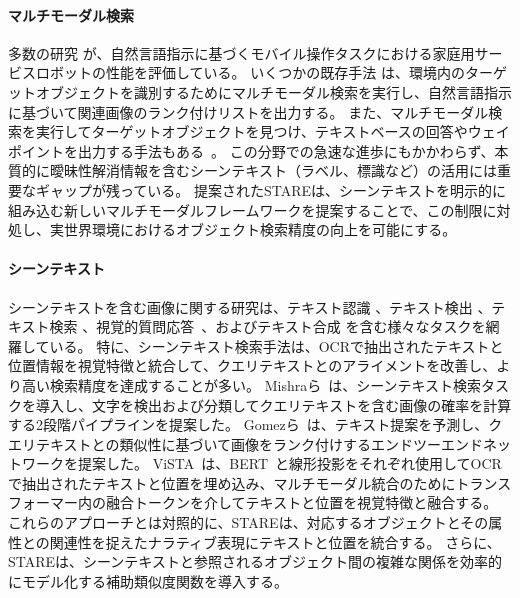 \paragraph{マルチモーダル検索}
多数の研究 \cite{Yenamandra2023HomeRobotOM, robocup}が、自然言語指示に基づくモバイル操作タスクにおける家庭用サービスロボットの性能を評価している。
いくつかの既存手法 \cite{nlmap, Sigurdsson2023RRExBoTRR, dm2rm, relaxformer}は、環境内のターゲットオブジェクトを識別するためにマルチモーダル検索を実行し、自然言語指示に基づいて関連画像のランク付けリストを出力する。
また、マルチモーダル検索を実行してターゲットオブジェクトを見つけ、テキストベースの回答やウェイポイントを出力する手法もある~\cite{xie2025embodiedrag}。
この分野での急速な進歩にもかかわらず、本質的に曖昧性解消情報を含むシーンテキスト（ラベル、標識など）の活用には重要なギャップが残っている。
提案されたSTAREは、シーンテキストを明示的に組み込む新しいマルチモーダルフレームワークを提案することで、この制限に対処し、実世界環境におけるオブジェクト検索精度の向上を可能にする。

\paragraph{シーンテキスト}
シーンテキストを含む画像に関する研究は、テキスト認識 \cite{Zhao2023MultimodalIL, OTE}、テキスト検出 \cite{Liang_2024_CVPR, STEP, Zheng_2024_CVPR}、テキスト検索 \cite{Zeng2024FocusDA, Zheng_2024_CVPR, vista}、視覚的質問応答~\cite{Biten2021LaTrLT, stvqa, Gao2020MultiModalGN}、およびテキスト合成 \cite{Cui_2024_CVPR, Duan2024ODMAT, Santoso2023OnMS}を含む様々なタスクを網羅している。
特に、シーンテキスト検索手法は、OCRで抽出されたテキストと位置情報を視覚特徴と統合して、クエリテキストとのアライメントを改善し、より高い検索精度を達成することが多い。
Mishraら~\cite{ocrvqa}は、シーンテキスト検索タスクを導入し、文字を検出および分類してクエリテキストを含む画像の確率を計算する2段階パイプラインを提案した。
Gomezら~\cite{GomezMaflaECCV2018single}は、テキスト提案を予測し、クエリテキストとの類似性に基づいて画像をランク付けするエンドツーエンドネットワークを提案した。
ViSTA~\cite{vista}は、BERT~\cite{Devlin2019BERTPO}と線形投影をそれぞれ使用してOCRで抽出されたテキストと位置を埋め込み、マルチモーダル統合のためにトランスフォーマー内の融合トークンを介してテキストと位置を視覚特徴と融合する。
これらのアプローチとは対照的に、STAREは、対応するオブジェクトとその属性との関連性を捉えたナラティブ表現にテキストと位置を統合する。
さらに、STAREは、シーンテキストと参照されるオブジェクト間の複雑な関係を効率的にモデル化する補助類似度関数を導入する。

